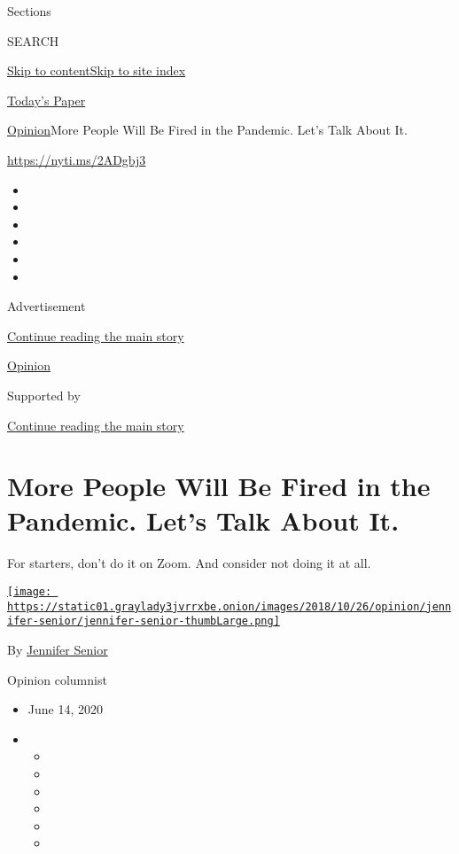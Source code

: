 Sections

SEARCH

\protect\hyperlink{site-content}{Skip to
content}\protect\hyperlink{site-index}{Skip to site index}

\href{https://myaccount.nytimes3xbfgragh.onion/auth/login?response_type=cookie\&client_id=vi}{}

\href{https://www.nytimes3xbfgragh.onion/section/todayspaper}{Today's
Paper}

\href{/section/opinion}{Opinion}\textbar{}More People Will Be Fired in
the Pandemic. Let's Talk About It.

\url{https://nyti.ms/2ADgbj3}

\begin{itemize}
\item
\item
\item
\item
\item
\item
\end{itemize}

Advertisement

\protect\hyperlink{after-top}{Continue reading the main story}

\href{/section/opinion}{Opinion}

Supported by

\protect\hyperlink{after-sponsor}{Continue reading the main story}

\hypertarget{more-people-will-be-fired-in-the-pandemic-lets-talk-about-it}{%
\section{More People Will Be Fired in the Pandemic. Let's Talk About
It.}\label{more-people-will-be-fired-in-the-pandemic-lets-talk-about-it}}

For starters, don't do it on Zoom. And consider not doing it at all.

\href{https://www.nytimes3xbfgragh.onion/by/jennifer-senior}{\texttt{[image: https://static01.graylady3jvrrxbe.onion/images/2018/10/26/opinion/jennifer-senior/jennifer-senior-thumbLarge.png]}}

By \href{https://www.nytimes3xbfgragh.onion/by/jennifer-senior}{Jennifer
Senior}

Opinion columnist

\begin{itemize}
\item
  June 14, 2020
\item
  \begin{itemize}
  \item
  \item
  \item
  \item
  \item
  \item
  \end{itemize}
\end{itemize}

